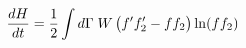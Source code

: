 \documentclass[preview]{standalone}
\begin{document}
\begin{align*}
\special{dvisvgm:raw <g id='unique000'>}\dv{H}{t}=\frac12\int d\Gamma\;W\,\big(f'f_2'-ff_2\big)\ln(ff_2)\special{dvisvgm:raw </g>}
\end{align*}
\end{document}
